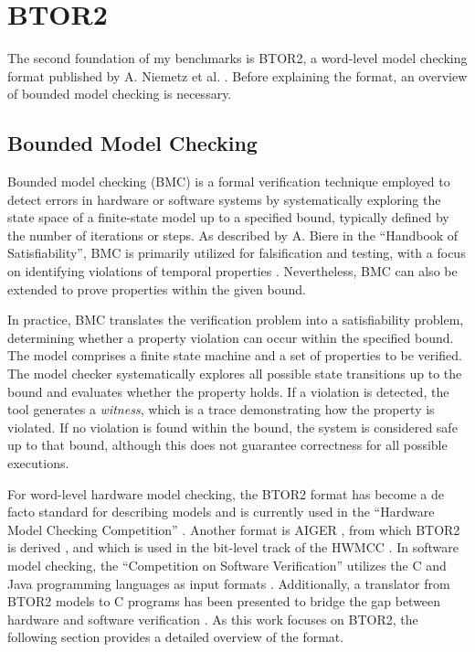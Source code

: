 \chapter{BTOR2}\label{chap:btor2}

The second foundation of my benchmarks is BTOR2, a word-level model
checking format published by A. Niemetz et al. \cite{btor2}. Before
explaining the format, an overview of bounded model checking is
necessary.

\section{Bounded Model Checking}
Bounded model checking (BMC) is a formal verification technique
employed to detect errors in hardware or software systems by
systematically exploring the state space of a finite-state model up
to a specified bound, typically defined by the number of iterations
or steps. As described by A. Biere in the \enquote{Handbook of
    Satisfiability}, BMC is primarily utilized for falsification and
testing, with a focus on identifying violations of temporal
properties \cite{BiereBMC}. Nevertheless, BMC can also be extended to
prove properties within the given bound.

In practice, BMC translates the verification problem into a
satisfiability problem, determining whether a property violation can
occur within the specified bound. The model comprises a finite state
machine and a set of properties to be verified. The model checker
systematically explores all possible state transitions up to the
bound and evaluates whether the property holds. If a violation is
detected, the tool generates a \emph{witness}, which is a trace
demonstrating how the property is violated. If no violation is found
within the bound, the system is considered safe up to that bound,
although this does not guarantee correctness for all possible
executions.

For word-level hardware model checking, the BTOR2 format has become a
de facto standard for describing models and is currently used in the
\enquote{Hardware Model Checking Competition} \cite{HWMCC}. Another
format is AIGER \cite{AIGER}, from which BTOR2 is derived
\cite{btor2}, and which is used in the bit-level track of the HWMCC
\cite{HWMCC}. In software model checking, the \enquote{Competition on
    Software Verification} utilizes the C and Java programming languages
as input formats \cite{SVCOMP25}. Additionally, a translator from
BTOR2 models to C programs has been presented to bridge the gap
between hardware and software verification \cite{btor2c}. As this
work focuses on BTOR2, the following section provides a detailed
overview of the format.

